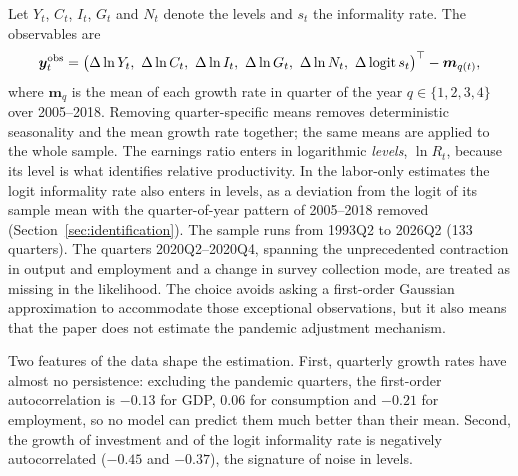 Let $Y_t$, $C_t$, $I_t$, $G_t$ and $N_t$ denote the levels and $s_t$ the informality rate. The observables are
\begin{equation}
\bm{y}^{\mathrm{obs}}_t = \big(\Delta\ln Y_t,\ \Delta\ln C_t,\ \Delta\ln I_t,\ \Delta\ln G_t,\ \Delta\ln N_t,\ \Delta\logit s_t\big)^{\top} - \bm{m}_{q(t)},
\label{eq:obs}
\end{equation}
where $\bm{m}_{q}$ is the mean of each growth rate in quarter of the year $q\in\{1,2,3,4\}$ over 2005--2018. Removing quarter-specific means removes deterministic seasonality and the mean growth rate together; the same means are applied to the whole sample. The earnings ratio enters in logarithmic \emph{levels}, $\ln R_t$, because its level is what identifies relative productivity. In the labor-only estimates the logit informality rate also enters in levels, as a deviation from the logit of its sample mean with the quarter-of-year pattern of 2005--2018 removed (Section~\ref{sec:identification}). The sample runs from 1993Q2 to 2026Q2 (133 quarters). The quarters 2020Q2--2020Q4, spanning the unprecedented contraction in output and employment and a change in survey collection mode, are treated as missing in the likelihood. The choice avoids asking a first-order Gaussian approximation to accommodate those exceptional observations, but it also means that the paper does not estimate the pandemic adjustment mechanism.

Two features of the data shape the estimation. First, quarterly growth rates have almost no persistence: excluding the pandemic quarters, the first-order autocorrelation is $-0.13$ for GDP, $0.06$ for consumption and $-0.21$ for employment, so no model can predict them much better than their mean. Second, the growth of investment and of the logit informality rate is negatively autocorrelated ($-0.45$ and $-0.37$), the signature of noise in levels.
